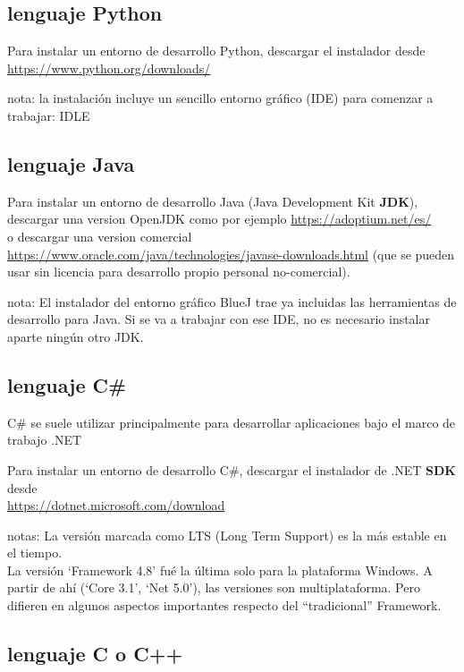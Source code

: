 \documentclass[spanish,12pt,a4paper,final,oneside]{book}
\begin{document}
\subsection{lenguaje Python}

Para instalar un entorno de desarrollo Python, descargar el instalador desde \\ \url{https://www.python.org/downloads/}

nota: la instalación incluye un sencillo entorno gráfico (IDE) para comenzar a trabajar:  IDLE


\subsection{lenguaje Java}

Para instalar un entorno de desarrollo Java (Java Development Kit \textbf{JDK}), descargar una version OpenJDK como por ejemplo \url{https://adoptium.net/es/}
\\ o descargar una version comercial \url{https://www.oracle.com/java/technologies/javase-downloads.html} (que se pueden usar sin licencia para desarrollo propio personal no-comercial). 

nota: El instalador del entorno gráfico BlueJ trae ya incluidas las herramientas de desarrollo para Java. Si se va a trabajar con ese IDE, no es necesario instalar aparte ningún otro JDK.



\subsection{lenguaje C\#}

C\# se suele utilizar principalmente para desarrollar aplicaciones bajo el marco de trabajo .NET

Para instalar un entorno de desarrollo C\#, descargar el instalador de .NET  \textbf{SDK} desde
\\ \url{https://dotnet.microsoft.com/download}

notas:
La versión marcada como LTS (Long Term Support) es la más estable en el tiempo.
\\La versión `Framework 4.8' fué la última solo para la plataforma Windows. A partir de ahí (`Core 3.1', `Net 5.0'), las versiones son multiplataforma. Pero difieren en algunos aspectos importantes respecto del ``tradicional'' Framework. 


\subsection{lenguaje C o C++}
\end{document}
